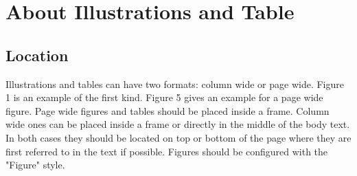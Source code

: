 \documentclass[10pt]{style_src/imeko_acta}
\begin{document}
\BgThispage

\section{About Illustrations and Table}

\subsection{Location}

Illustrations and tables can have two formats: column wide or page wide. Figure 1 is an example of the first kind\cite{Fazio1995}. Figure 5 gives an example for a page wide figure.
Page wide figures and tables should be placed inside a frame. Column wide ones can be placed inside a frame or directly in the middle of the body text. In both cases they should be located on top or bottom of the page where they are first referred to in the text if possible. Figures should be configured with the "Figure" style.
\end{document}

